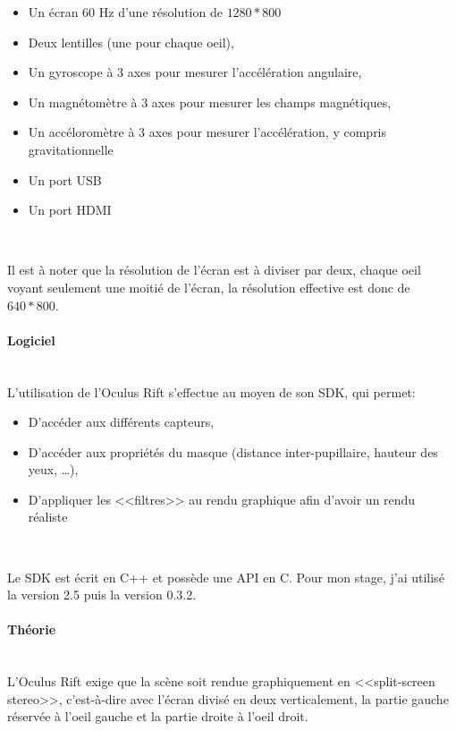 \documentclass[a4paper,french,12pt]{article}
\begin{document}
				\begin{itemize}
				\item Un écran 60 Hz d'une résolution de $1280*800$
				\item Deux lentilles (une pour chaque oeil),
				\item Un gyroscope à 3 axes pour mesurer l'accélération angulaire,
				\item Un magnétomètre à 3 axes pour mesurer les champs magnétiques,
				\item Un accéloromètre à 3 axes pour mesurer l'accélération, y compris gravitationnelle
				\item Un port USB
				\item Un port HDMI
				\end{itemize} ~
			       
				Il est à noter que la résolution de l'écran est à diviser par deux, chaque oeil voyant seulement
				une moitié de l'écran, la résolution effective est donc de $640*800$.
		    
			\paragraph{Logiciel} ~\\
			  
			    L'utilisation de l'Oculus Rift s'effectue au moyen de son SDK, qui permet:\\
			    
			    \begin{itemize}
			     \item D'accéder aux différents capteurs,
			     \item D'accéder aux propriétés du masque (distance inter-pupillaire, hauteur des yeux, \ldots),
			     \item D'appliquer les <<filtres>> au rendu graphique afin d'avoir un rendu réaliste
			    \end{itemize} ~
			    
			    Le SDK est écrit en C++ et possède une API en C.
			    Pour mon stage, j'ai utilisé la version 2.5 puis la version 0.3.2.
			
			\paragraph{Théorie} ~\\
			
			    L'Oculus Rift exige que la scène soit rendue graphiquement en <<split-screen stereo>>, 
			    c'est-à-dire avec l'écran divisé en deux verticalement, la partie gauche réservée à l'oeil gauche
			    et la partie droite à l'oeil droit.
			    
\end{document}
